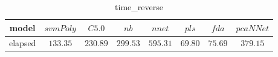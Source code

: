 \begin{table}[!ht]
	\centering
	\begin{tabular}{|c|c|c|c|c|c|c|c|}
		\hline
		model & $svmPoly$ & $C5.0$ & $nb$ & $nnet$ & $pls$ & $fda$ & $pcaNNet$ \\ \hline
		elapsed & $133.35$ & $230.89$ & $299.53$ & $595.31$ & $69.80$ & $75.69$ & $379.15$ \\ \hline
	\end{tabular}
	\caption{time_reverse}
	\label{tab:time_reverse}
\end{table}
